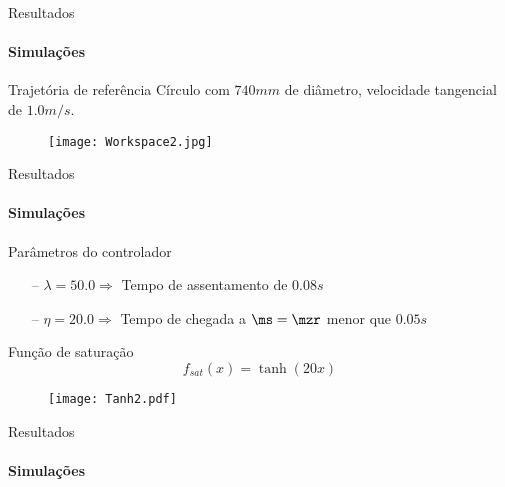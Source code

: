 \documentclass[25pt,landscape]{beamer}
\begin{document}
\begin{frame}{Resultados}
	\framesubtitle{Simula\c{c}\~oes}
	\begin{block}{Trajet\'oria de refer\^encia}
		C\'irculo com $740mm$ de di\^ametro, velocidade tangencial de $1.0m/s$.
	\end{block}
	\begin{figure}[!h]
        \centering
        \texttt{[image: Workspace2.jpg]}
    \end{figure}
\end{frame}

\begin{frame}{Resultados}
	\framesubtitle{Simula\c{c}\~oes}
	\begin{block}{Par\^ametros do controlador}
		\begin{itemize}
			\item[--] $ \lambda = 50.0 \Rightarrow$ Tempo de assentamento de $0.08s$ \\[8pt]
			\item[--] $ \eta = 20.0 \Rightarrow$ Tempo de chegada a $\ms=\mzr$ menor que $0.05s$ \\[8pt]
		\end{itemize}
	\end{block}
	\begin{block}{Fun\c{c}\~ao de satura\c{c}\~ao}
		$$f_{sat}(x) = \tanh(20x)$$
	\end{block}
	\begin{figure}[!h]
        \centering
        \texttt{[image: Tanh2.pdf]}
    \end{figure}
\end{frame}

\begin{frame}{Resultados}
	\framesubtitle{Simula\c{c}\~oes}
	
\end{frame}
\end{document}
